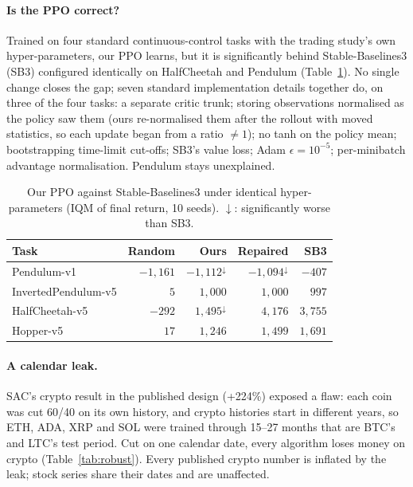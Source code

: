 \documentclass[10pt,twocolumn]{article}
\newcommand{\pc}{\%}  %
\begin{document}
\paragraph{Is the PPO correct?} Trained on four standard continuous-control tasks
with the trading study's own hyper-parameters, our PPO learns, but it is
significantly behind Stable-Baselines3 (SB3) \cite{sb3} configured identically on
HalfCheetah and Pendulum (Table~\ref{tab:bench}). No single change closes the gap;
seven standard implementation details \cite{huang2022} together do, on three of the
four tasks: a separate critic trunk; storing observations normalised as the policy
saw them (ours re-normalised them after the rollout with moved statistics, so each
update began from a ratio $\ne 1$); no tanh on the policy mean; bootstrapping
time-limit cut-offs; SB3's value loss; Adam $\epsilon=10^{-5}$; per-minibatch
advantage normalisation. Pendulum stays unexplained.

\begin{table}[t]\centering\footnotesize
\caption{Our PPO against Stable-Baselines3 under identical hyper-parameters (IQM of
final return, 10 seeds). $\downarrow$: significantly worse than SB3.}
\label{tab:bench}
\begin{tabular}{@{}lrrrr@{}}
\toprule
Task & Random & Ours & Repaired & SB3\\
\midrule
Pendulum-v1 & $-1{,}161$ & $-1{,}112^\downarrow$ & $-1{,}094^\downarrow$ & $-407$\\
InvertedPendulum-v5 & $5$ & $1{,}000$ & $1{,}000$ & $997$\\
HalfCheetah-v5 & $-292$ & $1{,}495^\downarrow$ & $4{,}176$ & $3{,}755$\\
Hopper-v5 & $17$ & $1{,}246$ & $1{,}499$ & $1{,}691$\\
\bottomrule
\end{tabular}
\end{table}

\paragraph{A calendar leak.} SAC's crypto result in the published design (+224\pc)
exposed a flaw: each coin was cut 60/40 on its own history, and crypto histories
start in different years, so ETH, ADA, XRP and SOL were trained through 15--27
months that are BTC's and LTC's test period. Cut on one calendar date, every
algorithm loses money on crypto (Table~\ref{tab:robust}). Every published crypto
number is inflated by the leak; stock series share their dates and are unaffected.
\end{document}
